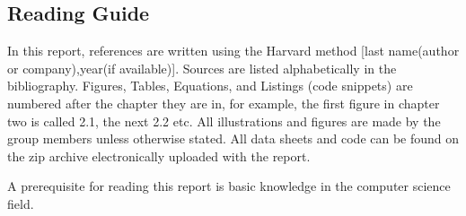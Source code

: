 \subsection*{Reading Guide}
\label{sub:reading_guide}

In this report, references are written using the Harvard method [last name(author or company),year(if available)].
Sources are listed alphabetically in the bibliography.
Figures, Tables, Equations, and Listings (code snippets) are numbered after the chapter they are in,
for example, the first figure in chapter two is called 2.1, the next 2.2 etc.
All illustrations and figures are made by the group members unless otherwise stated.
All data sheets and code can be found on the zip archive electronically uploaded with the report.

A prerequisite for reading this report is basic knowledge in the 
computer science field.

